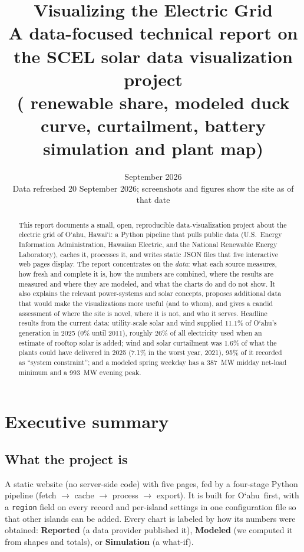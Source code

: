\documentclass[11pt,a4paper]{article}
\title{\textbf{Visualizing the \Hawaii{} Electric Grid}\\[4pt]
\large A data-focused technical report on the SCEL solar data visualization project\\
\large (\Oahu{} renewable share, modeled duck curve, curtailment, battery simulation and plant map)}
\author{}
\date{September 2026\\[2pt]\small Data refreshed 20 September 2026; screenshots and figures show the site as of that date}
\newcommand{\okina}{\textquoteleft}
\newcommand{\Oahu}{\texorpdfstring{O\okina ahu}{Oahu}}
\newcommand{\Hawaii}{\texorpdfstring{Hawai\okina i}{Hawaii}}
\newcommand{\code}[1]{\nolinkurl{#1}}      %
\begin{document}
\maketitle

\begin{abstract}
\noindent
This report documents a small, open, reproducible data-visualization project about the electric grid of
\Oahu, \Hawaii: a Python pipeline that pulls public data (U.S.\ Energy Information Administration, Hawaiian
Electric, and the National Renewable Energy Laboratory), caches it, processes it, and writes static JSON files
that five interactive web pages display. The report concentrates on the \emph{data}: what each source measures,
how fresh and complete it is, how the numbers are combined, where the results are measured and where they are
modeled, and what the charts do and do not show. It also explains the relevant power-systems and solar
concepts, proposes additional data that would make the visualizations more useful (and to whom), and gives a
candid assessment of where the site is novel, where it is not, and who it serves. Headline results from the
current data: utility-scale solar and wind supplied 11.1\% of \Oahu's generation in 2025 (0\% until 2011),
roughly 26\% of all electricity used when an estimate of rooftop solar is added; wind and solar curtailment
was 1.6\% of what the plants could have delivered in 2025 (7.1\% in the worst year, 2021), 95\% of it
recorded as ``system constraint''; and a modeled spring weekday has a 387~MW midday net-load minimum and a
993~MW evening peak.
\end{abstract}

\tableofcontents
\clearpage

\section{Executive summary}

\subsection*{What the project is}
A static website (no server-side code) with five pages, fed by a four-stage Python pipeline
(fetch $\rightarrow$ cache $\rightarrow$ process $\rightarrow$ export). It is built for \Oahu\ first, with a
\code{region} field on every record and per-island settings in one configuration file so that other islands can
be added. Every chart is labeled by how its numbers were obtained: \textbf{Reported} (a data provider
published it), \textbf{Modeled} (we computed it from shapes and totals), or \textbf{Simulation} (a what-if).
\end{document}
